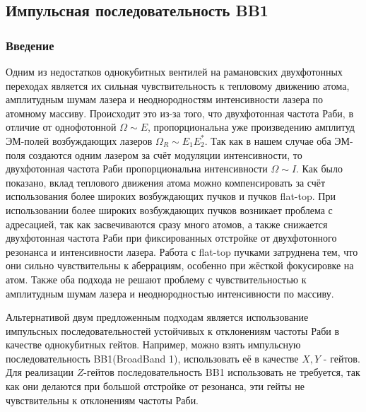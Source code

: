 
\subsection{Импульсная последовательность BB1}

\subsubsection{Введение}

Одним из недостатков однокубитных вентилей на рамановских двухфотонных переходах является их сильная чувствительность к тепловому движению атома, амплитудным шумам лазера и неоднородностям интенсивности лазера по атомному массиву. Происходит это из-за того, что двухфотонная частота Раби, в отличие от однофотонной $\Omega \sim E$, пропорциональна уже произведению амплитуд ЭМ-полей возбуждающих лазеров $\Omega_R \sim E_1 E_2^*$. Так как в нашем случае оба ЭМ-поля создаются одним лазером за счёт модуляции интенсивности, то двухфотонная частота Раби пропорциональна интенсивности $\Omega \sim I$. Как было показано, вклад теплового движения атома можно компенсировать за счёт использования более широких возбуждающих пучков и пучков flat-top. При использовании более широких возбуждающих пучков возникает проблема с адресацией, так как засвечиваются сразу много атомов, а также снижается двухфотонная частота Раби при фиксированных отстройке от двухфотонного резонанса и интенсивности лазера. Работа с flat-top пучками затруднена тем, что они сильно чувствительны к аберрациям, особенно при жёсткой фокусировке на атом. Также оба подхода не решают проблему с чувствительностью к амплитудным шумам лазера и неоднородностью интенсивности по массиву. 


Альтернативой двум предложенным подходам является использование импульсных последовательностей устойчивых к отклонениям частоты Раби в качестве однокубитных гейтов. Например, можно взять импульсную последовательность BB1(BroadBand 1)\cite{Wimperis1994BroadbandNA,WIMPERIS1989509,WIMPERIS199046}, использовать её в качестве $X, Y$ - гейтов. Для реализации $Z$-гейтов последовательность BB1 использовать не требуется, так как они делаются при большой отстройке от резонанса, эти гейты не чувствительны к отклонениям частоты Раби. 

